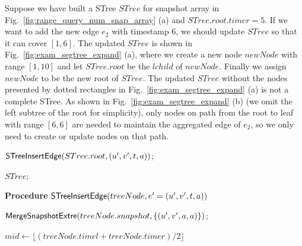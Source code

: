 \documentclass[10pt,journal,compsoc]{IEEEtran}
\begin{document}
{\begin{example}
	Suppose we have built a STree $ STree $ for snapshot array in Fig.~\ref{fig:range_query_num_snap_array} (a) and $ STree.root.timer=5 $. If we want to add the new edge $ e_2 $ with timestamp 6, we should update $ STree $ so that it can cover $ [1,6] $. The updated $ STree $ is shown in Fig.~\ref{fig:exam_segtree_expand} (a), where we create a new node $ newNode $ with range $ [1,10] $ and let $ STree.root $ be the $ lchild $ of $ newNode $. Finally we assign $ newNode $ to be the new root of $ STree $. The updated $ STree $ without the nodes presented by dotted rectangles in Fig.~\ref{fig:exam_segtree_expand} (a) is not a complete STree. As shown in Fig.~\ref{fig:exam_segtree_expand} (b) (we omit the left subtree of the root for simplicity), only nodes on path from the root to leaf with range $ [6,6] $ are needed to maintain the aggregated edge of $ e_2 $, so we only need to create or update nodes on that path.
\end{example}
}

\begin{algorithm}[t]
	\scriptsize
	\caption{$\kw{UpdateSTree}$}
	\label{alg:update_stree}
	${\mathsf{STreeInsertEdge}}(STree.root,(u',v',t,a))$;
	
	\Return $ STree $;

	\vspace*{0.2cm}
	{\bf Procedure} {${\mathsf{STreeInsertEdge}}(treeNode,e'=(u',v',t,a))$}
	
	$ {\mathsf{MergeSnapshotExtre}}(treeNode.snapshot,\{(u',v',a,a)\}) $;
	
	$ mid \gets \lfloor(treeNode.timel+treeNode.timer)/2\rfloor $\;
\end{algorithm}
\end{document}
